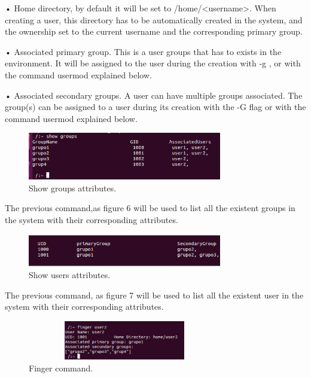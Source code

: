 \documentclass{aes2e}
\begin{document}
\begin{itemize}
• Home directory, by default it will be set to /home/<username>. When creating a user, this directory has to be automatically created in the system, and the ownership set to the current username and the corresponding primary group.

• Associated primary group. This is a user groups that has to exists in the environment. It will be assigned to the user during the creation with -g , or with the command usermod explained below.

• Associated secondary groups. A user can have multiple groups associated. The group(s) can be assigned to a user during its creation with the -G flag or with the command usermod explained below.

\begin{figure}[ht]
\centering
\includegraphics[width=20pc]{showgroups.eps}
\caption{Show groups attributes.}
\end{figure}

The previous command,as figure 6 will be used to list all the existent  groups in the system with their corresponding attributes.

\begin{figure}[ht]
\centering
\includegraphics[width=20pc]{showusers.eps}
\caption{Show users attributes.}
\end{figure}


The previous command, as figure 7 will be used to list all the existent user  in the system with their corresponding attributes.
 
\begin{figure}[ht]
\centering
\includegraphics[width=20pc,height=4pc]{fingeruser.eps}
\caption{Finger command.}
\end{figure}


\end{itemize}
\end{document}
